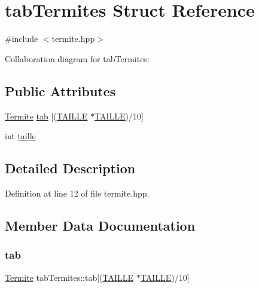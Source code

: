 \hypertarget{structtabTermites}{}\section{tab\+Termites Struct Reference}
\label{structtabTermites}


{\ttfamily \#include $<$termite.\+hpp$>$}



Collaboration diagram for tab\+Termites\+:
\subsection*{Public Attributes}
\begin{DoxyCompactItemize}
\item 
\hyperlink{structTermite}{Termite} \hyperlink{structtabTermites_aec7d894bba416023649f8409ae39cc23}{tab} \mbox{[}(\hyperlink{grille_8hpp_a3af25ad4074904b83ee7cca27a822751}{T\+A\+I\+L\+LE} $\ast$\hyperlink{grille_8hpp_a3af25ad4074904b83ee7cca27a822751}{T\+A\+I\+L\+LE})/10\mbox{]}
\item 
int \hyperlink{structtabTermites_a0fe7fc43b7bac06c6fc7c85dd8022126}{taille}
\end{DoxyCompactItemize}


\subsection{Detailed Description}


Definition at line 12 of file termite.\+hpp.



\subsection{Member Data Documentation}
\mbox{\label{structtabTermites_aec7d894bba416023649f8409ae39cc23}} 
\subsubsection{\texorpdfstring{tab}{tab}}
{\footnotesize\ttfamily \hyperlink{structTermite}{Termite} tab\+Termites\+::tab\mbox{[}(\hyperlink{grille_8hpp_a3af25ad4074904b83ee7cca27a822751}{T\+A\+I\+L\+LE} $\ast$\hyperlink{grille_8hpp_a3af25ad4074904b83ee7cca27a822751}{T\+A\+I\+L\+LE})/10\mbox{]}}



